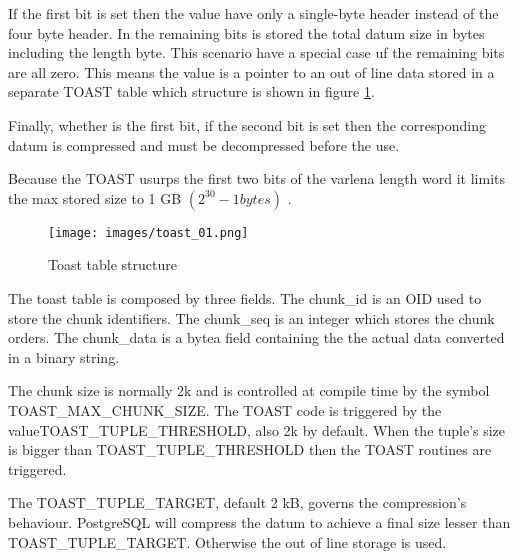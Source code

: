 If the first bit is set then the value have only a single-byte header instead of the four byte header. 
In the remaining bits is stored the total datum size in bytes including the length byte. This scenario 
have a special case uf the remaining bits are all zero. This means the value is a pointer to an out of line 
data stored in a separate TOAST table which structure is shown in figure \ref{fig:TOAST01}.\newline

Finally, whether is the first bit,  if the second bit is set then the corresponding datum is compressed and 
must be decompressed before the use.\newline

Because the TOAST usurps the first two bits of the varlena length word it limits the max stored size to 1 
GB  \begin{math} (2^{30} -1 bytes) \end{math} .

\begin{figure}[H]
\begin{center}

\texttt{[image: images/toast\_01.png]}

\caption{Toast table structure}
\label{fig:TOAST01} 
\end{center}

\end{figure}

The toast table is composed by three fields. The chunk\_id is an OID used to store the chunk identifiers. 
The chunk\_seq is an integer which stores the chunk orders. The chunk\_data is a bytea field containing the 
the actual data converted in a binary string.\newline 

The chunk size is normally 2k and is controlled at compile time by the symbol\newline 
TOAST\_MAX\_CHUNK\_SIZE. The TOAST code is triggered by the value\newline  TOAST\_TUPLE\_THRESHOLD, also 2k 
by default. When the tuple's size is 
bigger than \newline TOAST\_TUPLE\_THRESHOLD then the TOAST routines are triggered.\newline

The TOAST\_TUPLE\_TARGET, default 2 kB, governs the compression's behaviour. PostgreSQL will compress the 
datum to achieve a final size lesser than \newline TOAST\_TUPLE\_TARGET. Otherwise the out of line storage 
is used.

